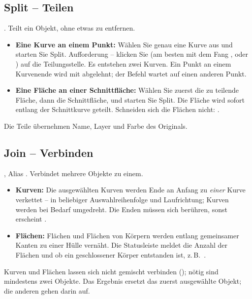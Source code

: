 \subsection{Split -- Teilen}\label{sec:cmd-split}
. Teilt ein Objekt, ohne etwas zu entfernen.
\begin{itemize}
\item \textbf{Eine Kurve an einem Punkt:} Wählen Sie genau eine Kurve aus und starten Sie
  Split. Aufforderung  -- klicken Sie (am besten mit
  dem Fang ,  oder ) auf die Teilungsstelle. Es entstehen zwei
  Kurven. Ein Punkt an einem Kurvenende wird mit  abgelehnt; der Befehl wartet auf einen anderen Punkt.
\item \textbf{Eine Fläche an einer Schnittfläche:} Wählen Sie zuerst die zu teilende Fläche,
  dann die Schnittfläche, und starten Sie Split. Die Fläche wird sofort entlang der Schnittkurve
  geteilt. Schneiden sich die Flächen nicht: .
\end{itemize}
Die Teile übernehmen Name, Layer und Farbe des Originals.

\subsection{Join -- Verbinden}\label{sec:cmd-join}
, Alias . Verbindet mehrere Objekte zu einem.
\begin{itemize}
\item \textbf{Kurven:} Die ausgewählten Kurven werden Ende an Anfang zu \emph{einer} Kurve
  verkettet -- in beliebiger Auswahlreihenfolge und Laufrichtung; Kurven werden bei Bedarf
  umgedreht. Die Enden müssen sich berühren, sonst erscheint
  .
\item \textbf{Flächen:} Flächen und Flächen von Körpern werden entlang gemeinsamer Kanten zu
  einer Hülle vernäht. Die Statusleiste meldet die Anzahl der Flächen und ob ein geschlossener
  Körper entstanden ist, z.\,B.\ .
\end{itemize}
Kurven und Flächen lassen sich nicht gemischt verbinden (); nötig sind mindestens zwei Objekte. Das Ergebnis ersetzt das zuerst ausgewählte
Objekt; die anderen gehen darin auf.

